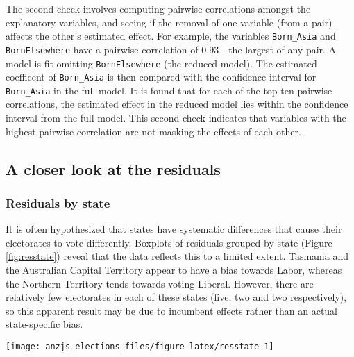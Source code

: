 \documentclass[times, doublespace]{anzsauth}
\let\origfigure\figure
\let\endorigfigure\endfigure
\renewenvironment{figure}[1][2] {
    \expandafter\origfigure\expandafter[htbp]
} {
    \endorigfigure
}
\begin{document}
The second check involves computing pairwise correlations amongst the explanatory variables, and seeing if the removal of one variable (from a pair) affects the other's estimated effect. For example, the variables \texttt{Born\_Asia} and \texttt{BornElsewhere} have a pairwise correlation of \(0.93\) - the largest of any pair. A model is fit omitting \texttt{BornElsewhere} (the reduced model). The estimated coefficent of \texttt{Born\_Asia} is then compared with the confidence interval for \texttt{Born\_Asia} in the full model. It is found that for each of the top ten pairwise correlations, the estimated effect in the reduced model lies within the confidence interval from the full model. This second check indicates that variables with the highest pairwise correlation are not masking the effects of each other.

\hypertarget{a-closer-look-at-the-residuals}{%
\subsection{A closer look at the residuals}\label{a-closer-look-at-the-residuals}}

\hypertarget{residuals-by-state}{%
\subsubsection*{Residuals by state}\label{residuals-by-state}}

It is often hypothesized that states have systematic differences that cause their electorates to vote differently. Boxplots of residuals grouped by state (Figure \ref{fig:resstate}) reveal that the data reflects this to a limited extent. Tasmania and the Australian Capital Territory appear to have a bias towards Labor, whereas the Northern Territory tends towards voting Liberal. However, there are relatively few electorates in each of these states (five, two and two respectively), so this apparent result may be due to incumbent effects rather than an actual state-specific bias.

\begin{figure}[h]

{\centering \texttt{[image: anzjs\_elections\_files/figure-latex/resstate-1]} 

}

\caption{Boxplot of residuals by state with jittered points. States ordered by median residual. A state-specific bias present only in the smaller states appears to have not been captured by the model.}\label{fig:resstate}
\end{figure}
\end{document}

